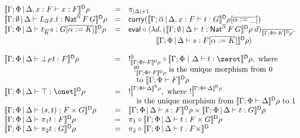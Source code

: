 \documentclass[runningheads]{llncs}
\begin{document}
\begin{figure}[t]
\begin{adjustbox}{varwidth=6in, max width=5.3in, fbox, center}
\[\begin{array}{lll}
\dsem{\Gamma;\Phi \,|\, \Delta,x :F \vdash x : F} \rho& = &
\pi_{|\Delta|+1}\\
\dsem{\Gamma;\emptyset \,|\, \Delta \vdash L_{\overline \alpha} x.t : \Nat^{\overline
    \alpha} \,F \,G}\rho & = &  \curry (\dsem{\Gamma;\overline \alpha
  \,|\, \Delta, x : F \vdash t: G}\rho[\overline{\alpha := \_}])\\
\dsem{\Gamma;\Phi \,|\, \Delta \vdash t_{\overline K} s:
  G [\overline{\alpha := K}]}\rho & = & \eval \circ \langle
  \lambda d.\,(\dsem{\Gamma;\emptyset \,|\, \Delta \vdash t :
  \Nat^{\overline{\alpha}} \,F \,G}\rho\; d)_{\overline{\dsem{\Gamma;\Phi
      \vdash K}\rho}},\\ 
 & & \hspace*{0.5in} \dsem{\Gamma;\Phi \,|\,
    \Delta \vdash s: F [\overline{\alpha := K}]}\rho \rangle\\ 
& & \\
\dsem{\Gamma;\Phi \,|\, \Delta \vdash \bot_F t : F} \rho& = &
!^0_{\dsem{\Gamma;\Phi \vdash F}\rho} \circ
  \dsem{\Gamma;\Phi~|~\Delta \vdash t : \zerot}\rho, \mbox{ where } \\
 & & \hspace*{0.1in} !^0_{\dsem{\Gamma;\Phi \vdash F}\rho}
\mbox{ is the unique morphism from } 0\\
 & & \hspace*{0.1in} \mbox{ to } \dsem{\Gamma;\Phi \vdash F}\rho\\
\dsem{\Gamma;\Phi \,|\, \Delta \vdash \top : \onet}\rho & = &
!^{\dsem{\Gamma;\Phi\vdash \Delta}\rho}_1, \mbox{ where }
!^{\dsem{\Gamma;\Phi\vdash \Delta}\rho}_1\\ 
& & \hspace*{0.1in} \mbox{ is the unique morphism from }
\dsem{\Gamma;\Phi\vdash \Delta}\rho \mbox{ to } 1\\ 
\dsem{\Gamma;\Phi \,|\, \Delta \vdash (s,t) : F \times G} \rho& = &
\dsem{\Gamma;\Phi \,|\, \Delta \vdash s: F} \rho\times
\dsem{\Gamma;\Phi \,|\, \Delta \vdash t : G} \rho\\
\dsem{\Gamma;\Phi \,|\, \Delta \vdash \pi_1 t : F} \rho& = &
\pi_1 \circ \dsem{\Gamma;\Phi \,|\, \Delta \vdash t : F \times G}\rho\\
\dsem{\Gamma;\Phi \,|\, \Delta \vdash \pi_2 t : G}\rho & = &
\pi_2 \circ \dsem{\Gamma;\Phi \,|\, \Delta \vdash t : F \times
}
\end{array}\]
\end{adjustbox}
\end{figure}
\end{document}
